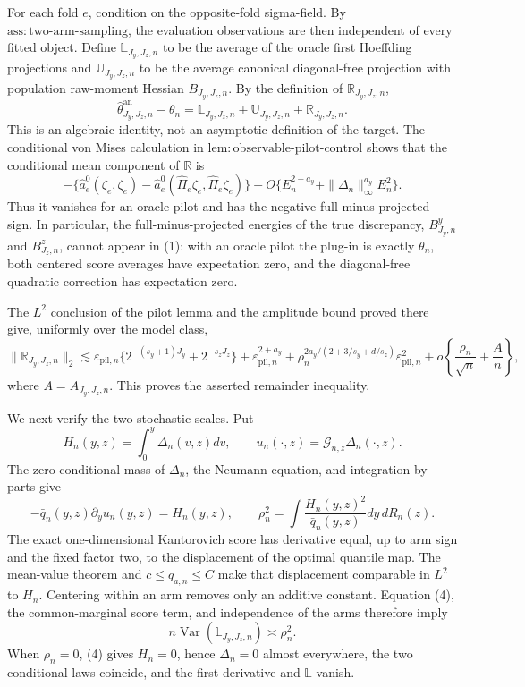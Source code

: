 For each fold \(e\), condition on the opposite-fold sigma-field. By \(\mathrm{ass{:}two\text{-}arm\text{-}sampling}\), the evaluation observations are then independent of every fitted object.  Define \(\mathbb L_{J_y,J_z,n}\) to be the average of the oracle first Hoeffding projections and \(\mathbb U_{J_y,J_z,n}\) to be the average canonical diagonal-free projection with population raw-moment Hessian \(B_{J_y,J_z,n}\).  By the definition of \(\mathbb R_{J_y,J_z,n}\),
\[
\widehat\theta^{\mathrm{an}}_{J_y,J_z,n}-\theta_n
=\mathbb L_{J_y,J_z,n}+\mathbb U_{J_y,J_z,n}+\mathbb R_{J_y,J_z,n}. \tag{1}
\]
This is an algebraic identity, not an asymptotic definition of the target.  The conditional von Mises calculation in \(\mathrm{lem{:}observable\text{-}pilot\text{-}control}\) shows that the conditional mean component of \(\mathbb R\) is
\[
-\{\widehat a_e^0(\zeta_e,\zeta_e)
-\widehat a_e^0(\widehat\Pi_e\zeta_e,\widehat\Pi_e\zeta_e)\}
+O\{E_n^{2+a_y}+\|\Delta_n\|_\infty^{a_y}E_n^2\}.              \tag{2}
\]
Thus it vanishes for an oracle pilot and has the negative full-minus-projected sign.  In particular, the full-minus-projected energies of the true discrepancy, \(B^y_{J_y,n}\) and \(B^z_{J_z,n}\), cannot appear in (1): with an oracle pilot the plug-in is exactly \(\theta_n\), both centered score averages have expectation zero, and the diagonal-free quadratic correction has expectation zero.

The \(L^2\) conclusion of the pilot lemma and the amplitude bound proved there give, uniformly over the model class,
\[
\|\mathbb R_{J_y,J_z,n}\|_2
\lesssim
\varepsilon_{\mathrm{pil},n}\{2^{-(s_y+1)J_y}+2^{-s_zJ_z}\}
+\varepsilon_{\mathrm{pil},n}^{2+a_y}
+\rho_n^{2a_y/(2+3/s_y+d/s_z)}\varepsilon_{\mathrm{pil},n}^2
+o\!\left\{\frac{\rho_n}{\sqrt n}+\frac A n\right\},          \tag{3}
\]
where \(A=A_{J_y,J_z,n}\). This proves the asserted remainder inequality.

We next verify the two stochastic scales.  Put
\[
H_n(y,z)=\int_0^y\Delta_n(v,z)dv,
\qquad u_n(\cdot,z)=\mathcal G_{n,z}\Delta_n(\cdot,z).
\]
The zero conditional mass of \(\Delta_n\), the Neumann equation, and integration by parts give
\[
-\bar q_n(y,z)\partial_yu_n(y,z)=H_n(y,z),
\qquad
\rho_n^2=\int\frac{H_n(y,z)^2}{\bar q_n(y,z)}dy\,dR_n(z).       \tag{4}
\]
The exact one-dimensional Kantorovich score has derivative equal, up to arm sign and the fixed factor two, to the displacement of the optimal quantile map.  The mean-value theorem and \(c\le q_{a,n}\le C\) make that displacement comparable in \(L^2\) to \(H_n\).  Centering within an arm removes only an additive constant.  Equation (4), the common-marginal score term, and independence of the arms therefore imply
\[
n\operatorname{Var}(\mathbb L_{J_y,J_z,n})\asymp\rho_n^2.       \tag{5}
\]
When \(\rho_n=0\), (4) gives \(H_n=0\), hence \(\Delta_n=0\) almost everywhere, the two conditional laws coincide, and the first derivative and \(\mathbb L\) vanish.

